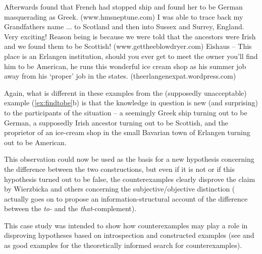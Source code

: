 \begin{exe}
\ex
\begin{xlist}
\label{ex:findtobenationality}
\ex Afterwards found that French had stopped ship and found her to be German masquerading as Greek. (www.hmsneptune.com)
\ex I was able to trace back my Grandfathers name ... to Scotland and then into Sussex and Surrey, England. Very exciting! Reason being is because we were told that the ancestors were Irish and we found them to be Scottish! (www.gettheeblowdryer.com)
\ex Eishaus -- This place is an Erlangen institution, should you ever get to meet the owner you'll find him to be American, he runs this wonderful ice cream shop as his summer job away from his `proper' job in the states. (theerlangenexpat.wordpress.com)
\end{xlist}
\end{exe}

Again, what is different in these examples from the (supposedly unacceptable) example (\ref{ex:findtobe}b) is that the knowledge in question is new (and surprising) to the participants of the situation -- a seemingly Greek ship turning out to be German, a supposedly Irish ancestor turning out to be Scottish, and the proprietor of an ice\hyp{}cream shop in the small Bavarian town of Erlangen turning out to be American.

This observation could now be used as the basis for a new hypothesis concerning the difference between the two constructions, but even if it is not or if this hypothesis turned out to be false, the counterexamples  clearly disprove the claim by Wierzbicka and others concerning the subjective\slash objective distinction (\citealt{rohdenburg_is_2003} actually goes on to propose an information\hyp{}structural account of the difference between the \textit{to-} and the  \textit{that}-complement).

This case study was intended to show how counterexamples  may play a role in disproving hypotheses based on introspection  and constructed examples (see \citealt{meurers_use_2005} and \citealt{meurers_corpora_2009} as good examples for the theoretically informed search for counterexamples).

